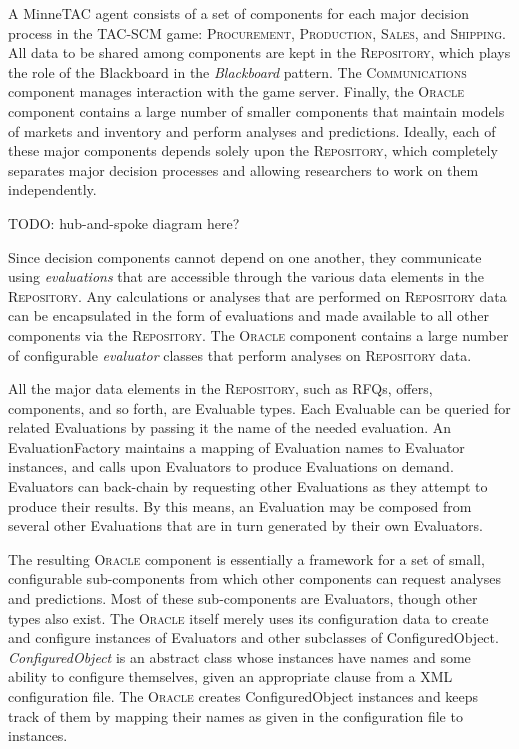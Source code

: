 \documentclass{article}
\begin{document}
A MinneTAC agent consists of a set of components for each major decision process in the TAC-SCM game:  \textsc{Procurement}, \textsc{Production}, \textsc{Sales}, and \textsc{Shipping}.
All data to be shared among components are kept in the \textsc{Repository}, which plays the role of the Blackboard in the \emph{Blackboard} pattern\cite{Busch96}.
The \textsc{Communications} component manages interaction with the game server.
Finally, the \textsc{Oracle} component contains a large number of smaller components that maintain models of markets and inventory and perform analyses and predictions.
Ideally, each of these major components depends solely upon the \textsc{Repository}, which completely separates major decision processes and allowing researchers to work on them independently.

TODO:  hub-and-spoke diagram here?

Since decision components cannot depend on one another, they communicate using \emph{evaluations} that are accessible through the various data elements in the \textsc{Repository}.
Any calculations or analyses that are performed on \textsc{Repository} data can be encapsulated in the form of evaluations and made available to all other components via the \textsc{Repository}.
The \textsc{Oracle} component contains a large number of configurable \emph{evaluator} classes that perform analyses on \textsc{Repository} data.

All the major data elements in the \textsc{Repository}, such as RFQs, offers, components, and so forth, are Evaluable types.
Each Evaluable can be queried for related Evaluations by passing it the name of the needed evaluation.
An EvaluationFactory maintains a mapping of Evaluation names to Evaluator instances, and calls upon Evaluators to produce Evaluations on demand.
Evaluators can back-chain by requesting other Evaluations as they attempt to produce their results.
By this means, an Evaluation may be composed from several other Evaluations that are in turn generated by their own Evaluators.

The resulting \textsc{Oracle} component is essentially a framework for a set of small, configurable sub-components from which other components can request analyses and predictions.
Most of these sub-components are Evaluators, though other types also exist.
The \textsc{Oracle} itself merely uses its configuration data to create and configure instances of Evaluators and other subclasses of ConfiguredObject.
\emph{ConfiguredObject} is an abstract class whose instances have names and some ability to configure themselves, given an appropriate clause from a XML configuration file.
The \textsc{Oracle} creates ConfiguredObject instances and keeps track of them by mapping their names as given in the configuration file to instances.
\end{document}
